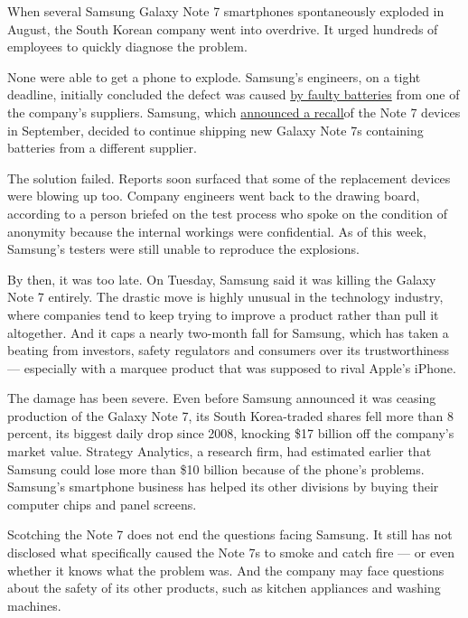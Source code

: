 When several Samsung Galaxy Note 7 smartphones spontaneously exploded in
August, the South Korean company went into overdrive. It urged hundreds
of employees to quickly diagnose the problem.

None were able to get a phone to explode. Samsung's engineers, on a
tight deadline, initially concluded the defect was caused
\href{http://www.nytimes3xbfgragh.onion/2016/09/03/technology/samsungs-recall-the-problem-with-lithium-ion-batteries.html}{by
faulty batteries} from one of the company's suppliers. Samsung, which
\href{http://www.nytimes3xbfgragh.onion/2016/09/03/business/samsung-galaxy-note-battery.html}{announced
a recall}of the Note 7 devices in September, decided to continue
shipping new Galaxy Note 7s containing batteries from a different
supplier.

The solution failed. Reports soon surfaced that some of the replacement
devices were blowing up too. Company engineers went back to the drawing
board, according to a person briefed on the test process who spoke on
the condition of anonymity because the internal workings were
confidential. As of this week, Samsung's testers were still unable to
reproduce the explosions.

By then, it was too late. On Tuesday, Samsung said it was killing the
Galaxy Note 7 entirely. The drastic move is highly unusual in the
technology industry, where companies tend to keep trying to improve a
product rather than pull it altogether. And it caps a nearly two-month
fall for Samsung, which has taken a beating from investors, safety
regulators and consumers over its trustworthiness --- especially with a
marquee product that was supposed to rival Apple's iPhone.

The damage has been severe. Even before Samsung announced it was ceasing
production of the Galaxy Note 7, its South Korea-traded shares fell more
than 8 percent, its biggest daily drop since 2008, knocking \$17 billion
off the company's market value. Strategy Analytics, a research firm, had
estimated earlier that Samsung could lose more than \$10 billion because
of the phone's problems. Samsung's smartphone business has helped its
other divisions by buying their computer chips and panel screens.

Scotching the Note 7 does not end the questions facing Samsung. It still
has not disclosed what specifically caused the Note 7s to smoke and
catch fire --- or even whether it knows what the problem was. And the
company may face questions about the safety of its other products, such
as kitchen appliances and washing machines.

